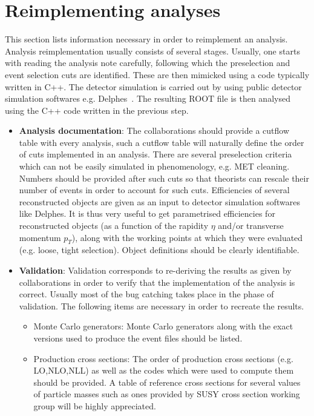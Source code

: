 \section{Reimplementing analyses}
This section lists information necessary in order to reimplement an analysis. Analysis reimplementation usually consists of several stages. Usually, one starts with reading the analysis note carefully, following which the preselection and event selection cuts are identified. These are then mimicked using a code typically written in C++. The detector simulation is carried out by using public detector simulation softwares e.g.  Delphes~\cite{deFavereau:2013fsa}.  The resulting ROOT file is then analysed using the C++ code written in the previous step.
\begin{itemize}
\item \textbf{Analysis documentation}: The collaborations should provide a cutflow table with every analysis, such a cutflow table will naturally define the order of cuts implemented in an analysis. There are several preselection criteria which can not be easily simulated in phenomenology, e.g. MET cleaning. Numbers should be provided after such cuts so that theorists can rescale their number of events in order to account for such cuts. Efficiencies of several reconstructed objects are given as an input to detector simulation softwares like Delphes. It is thus very useful to get parametrised efficiencies for reconstructed objects (as a function of the rapidity $\eta$ and/or transverse momentum $p_T$), along with the working points at which they were evaluated (e.g. loose, tight selection). Object definitions should be clearly identifiable. 
\item \textbf{Validation}: Validation corresponds to re-deriving the results as given by collaborations in order to verify that the implementation of the analysis is correct. Usually most of the bug catching takes place in the phase of validation. The following items are necessary in order to recreate the results. 
\begin {itemize}
	\item Monte Carlo generators: Monte Carlo generators along with the exact versions used to produce the event files should be listed. 
	\item Production cross sections: The order of production cross sections (e.g. LO,NLO,NLL) as well as the codes which were used to compute them should be provided. A table of reference cross sections for several values of particle masses such as ones provided by SUSY cross section working group will be highly appreciated.

\end{itemize}
\end{itemize}
